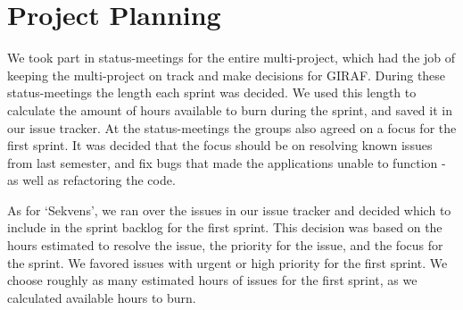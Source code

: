 \section{Project Planning}\label{spr1_projplan}
We took part in status-meetings for the entire multi-project, which had the job of keeping the multi-project on track and make decisions for GIRAF. During these status-meetings the length each sprint was decided. We used this length to calculate the amount of hours available to burn during the sprint, and saved it in our issue tracker. At the status-meetings the groups also agreed on a focus for the first sprint. It was decided that the focus should be on resolving known issues from last semester, and fix bugs that made the applications unable to function -as well as refactoring the code.

As for `Sekvens', we ran over the issues in our issue tracker and decided which to include in the sprint backlog for the first sprint. This decision was based on the hours estimated to resolve the issue, the priority for the issue, and the focus for the sprint. We favored issues with urgent or high priority for the first sprint. We choose roughly as many estimated hours of issues for the first sprint, as we calculated available hours to burn. 